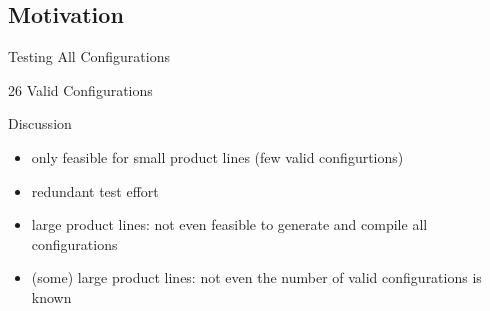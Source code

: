 
\subsection{Motivation}
\begin{frame}{Testing All Configurations}
	\begin{fancycolumns}
		\begin{exampletight}{}
			\centering{}
		\end{exampletight}
		
		\begin{example}{26 Valid Configurations}
			\footnotesize
		\end{example}
		\nextcolumn
		\begin{note}{Discussion}
			\begin{itemize}
				\item only feasible for small product lines (few valid configurtions)
				\item redundant test effort
				\item large product lines: not even feasible to generate and compile all configurations
				\item (some) large product lines: not even the number of valid configurations is known
			\end{itemize}
		\end{note}
	\end{fancycolumns}
\end{frame}


